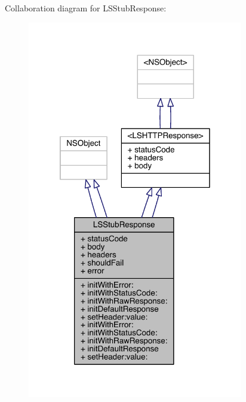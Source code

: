 Collaboration diagram for L\-S\-Stub\-Response\-:\nopagebreak
\begin{figure}[H]
\begin{center}
\leavevmode
\includegraphics[width=267pt]{interface_l_s_stub_response__coll__graph}
\end{center}
\end{figure}

